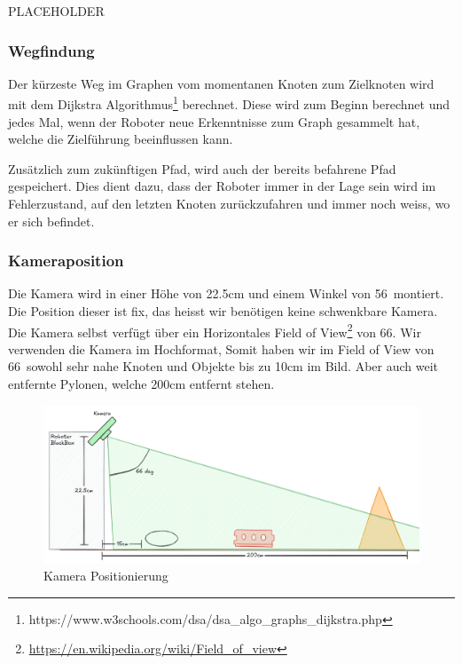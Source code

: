 PLACEHOLDER

\subsubsection{Wegfindung}

Der kürzeste Weg im Graphen vom momentanen Knoten zum Zielknoten wird mit dem Dijkstra Algorithmus\footnote{https://www.w3schools.com/dsa/dsa\_algo\_graphs\_dijkstra.php} berechnet. Diese wird zum Beginn berechnet und jedes Mal, wenn der Roboter neue Erkenntnisse zum Graph gesammelt hat, welche die Zielführung beeinflussen kann.

Zusätzlich zum zukünftigen Pfad, wird auch der bereits befahrene Pfad gespeichert. Dies dient dazu, dass der Roboter immer in der Lage sein wird im Fehlerzustand, auf den letzten Knoten zurückzufahren und immer noch weiss, wo er sich befindet.

\subsubsection{Kameraposition}

Die Kamera wird in einer Höhe von 22.5cm und einem Winkel von 56\textdegree\ montiert. Die Position dieser ist fix, das heisst wir benötigen keine schwenkbare Kamera.
Die Kamera selbst verfügt über ein Horizontales Field of View\footnote{\url{https://en.wikipedia.org/wiki/Field_of_view}} von 66\textdegree. Wir verwenden die Kamera im Hochformat, Somit haben wir im Field of View von 66\textdegree\ sowohl sehr nahe Knoten und Objekte bis zu 10cm im Bild. Aber auch weit entfernte Pylonen, welche 200cm entfernt stehen.

\begin{figure}[H]
    \centering
    \includegraphics[width=1\linewidth]{assets//informatik-prototyp//camera/camera_position.png}
    \caption{Kamera Positionierung}
    \label{fig:camera-position-concept}
\end{figure}

